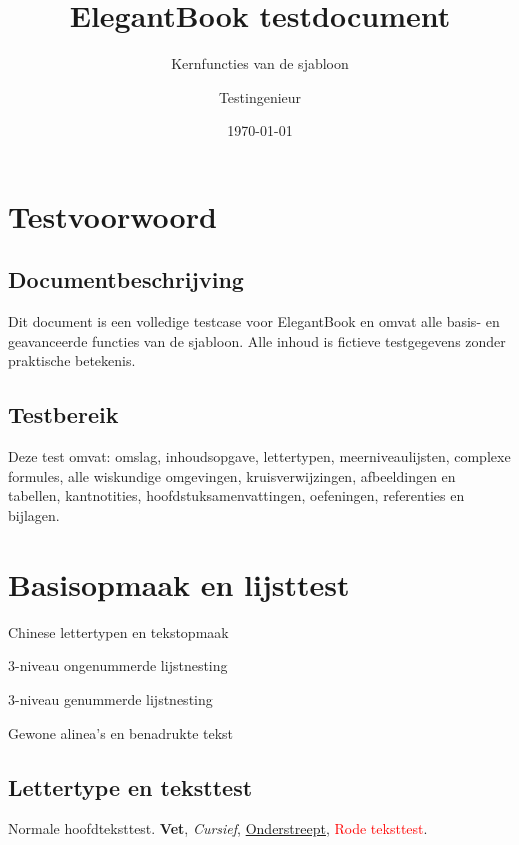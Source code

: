\documentclass[nl]{../../elegantbook}
\title{ElegantBook testdocument}
\subtitle{Kernfuncties van de sjabloon}
\author{Testingenieur}
\institute{Sjabloon Testgroep}
\date{\today}
\begin{document}
\maketitle
\frontmatter
\tableofcontents

\setcounter{page}{0}
\chapter*{Testvoorwoord}
\section*{Documentbeschrijving}
Dit document is een volledige testcase voor ElegantBook en omvat alle basis- en geavanceerde functies van de sjabloon. Alle inhoud is fictieve testgegevens zonder praktische betekenis.
\newpage
\section*{Testbereik}
Deze test omvat: omslag, inhoudsopgave, lettertypen, meerniveaulijsten, complexe formules, alle wiskundige omgevingen, kruisverwijzingen, afbeeldingen en tabellen, kantnotities, hoofdstuksamenvattingen, oefeningen, referenties en bijlagen.

\mainmatter

\chapter{Basisopmaak en lijsttest}
\begin{introduction}
\item Chinese lettertypen en tekstopmaak
\item 3-niveau ongenummerde lijstnesting
\item 3-niveau genummerde lijstnesting
\item Gewone alinea's en benadrukte tekst
\end{introduction}

\section{Lettertype en teksttest}
Normale hoofdteksttest. \textbf{Vet}, \textit{Cursief}, \underline{Onderstreept}, \textcolor{red}{Rode teksttest}.
\end{document}
